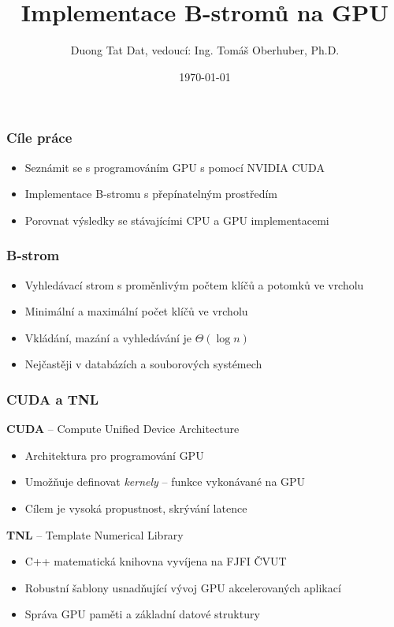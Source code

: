 \documentclass[aspectratio=169]{beamer}
\title{Implementace B-stromů na GPU}
\author{Duong Tat Dat, vedoucí: Ing. Tomáš Oberhuber, Ph.D.}
\institute{České vysoké učení technické v Praze, Fakulta informačních technologií\\Katedra teoretické informatiky}
\date{\today}
\begin{document}

{
  \begin{frame}
    \vspace*{2.25em}
    \titlepage
  \end{frame}
}

\begin{frame}
  \frametitle{Cíle práce}
  \begin{itemize}
    \item Seznámit se s programováním GPU s pomocí NVIDIA CUDA
    \item Implementace B-stromu s přepínatelným prostředím
    \item Porovnat výsledky se stávajícími CPU a GPU implementacemi
  \end{itemize}
\end{frame}

\begin{frame}
  \frametitle{B-strom}
  \begin{itemize}
    \item Vyhledávací strom s proměnlivým počtem klíčů a potomků ve vrcholu
    \item Minimální a maximální počet klíčů ve vrcholu
    \item Vkládání, mazání a vyhledávání je $\Theta{(\log n)}$
    \item Nejčastěji v databázích a souborových systémech
  \end{itemize}
\end{frame}

\begin{frame}
  \frametitle{CUDA a TNL}
  \textbf{CUDA} -- Compute Unified Device Architecture
  \begin{itemize}
    \item Architektura pro programování GPU
    \item Umožňuje definovat \textit{kernely} -- funkce vykonávané na GPU
    \item Cílem je vysoká propustnost, skrývání latence
  \end{itemize}

  \textbf{TNL} -- Template Numerical Library
  \begin{itemize}
    \item C++ matematická knihovna vyvíjena na FJFI ČVUT
    \item Robustní šablony usnadňující vývoj GPU akcelerovaných aplikací
    \item Správa GPU paměti a základní datové struktury
  \end{itemize}
\end{frame}
\end{document}
